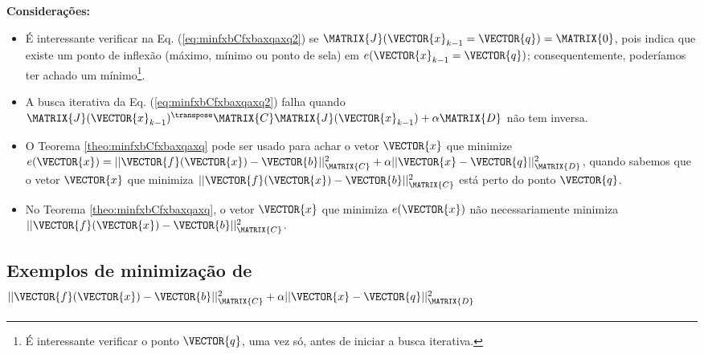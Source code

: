 \begin{theorem}
\textbf{Considerações:}

\begin{itemize}
\item É interessante verificar na Eq. (\ref{eq:minfxbCfxbaxqaxq2}) 
se  $\MATRIX{J}(\VECTOR{x}_{k-1}=\VECTOR{q}) = \MATRIX{0}$,
pois indica que existe um ponto de inflexão 
(máximo, mínimo ou ponto de sela) em $e(\VECTOR{x}_{k-1}=\VECTOR{q})$;
consequentemente, poderíamos ter achado um mínimo\footnote{\label{foot:labq}É 
interessante verificar o ponto $\VECTOR{q}$, uma vez só, 
antes de iniciar a busca iterativa.}.
\item A busca iterativa da Eq. (\ref{eq:minfxbCfxbaxqaxq2}) falha quando 
$\MATRIX{J}(\VECTOR{x}_{k-1})^{\transpose}\MATRIX{C} \MATRIX{J}(\VECTOR{x}_{k-1}) +\alpha\MATRIX{D}$
não tem inversa.
\end{itemize}

\end{theorem} 

\begin{tcbattention}
\begin{itemize}
\item O Teorema \ref{theo:minfxbCfxbaxqaxq} pode ser usado para achar o vetor $\VECTOR{x}$
que minimize $e(\VECTOR{x})=||\VECTOR{f}(\VECTOR{x})-\VECTOR{b}||_{\MATRIX{C}}^2+\alpha||\VECTOR{x}-\VECTOR{q}||_{\MATRIX{D}}^2$,
quando sabemos que o vetor $\VECTOR{x}$ que minimiza $||\VECTOR{f}(\VECTOR{x})-\VECTOR{b}||_{\MATRIX{C}}^2$ 
está perto do ponto $\VECTOR{q}$.
\item No Teorema \ref{theo:minfxbCfxbaxqaxq}, o vetor $\VECTOR{x}$ que minimiza $e(\VECTOR{x})$ 
não necessariamente minimiza  $||\VECTOR{f}(\VECTOR{x})-\VECTOR{b}||_{\MATRIX{C}}^2$.
\end{itemize}
\end{tcbattention}

\subsection{Exemplos de minimização de 
$||\VECTOR{f}(\VECTOR{x})-\VECTOR{b}||_{\MATRIX{C}}^2+\alpha||\VECTOR{x}-\VECTOR{q}||_{\MATRIX{D}}^2$}


